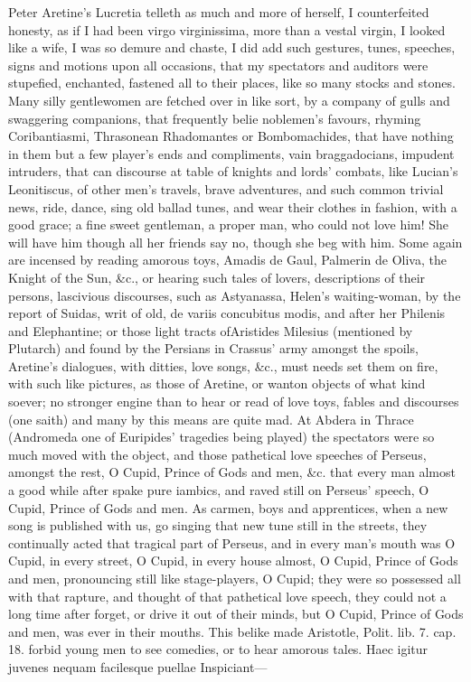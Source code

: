 {Peter Aretine's Lucretia telleth as much and more of herself, I
counterfeited honesty, as if I had been virgo virginissima, more than a
vestal virgin, I looked like a wife, I was so demure and chaste, I did
add such gestures, tunes, speeches, signs and motions upon all
occasions, that my spectators and auditors were stupefied, enchanted,
fastened all to their places, like so many stocks and stones. Many
silly gentlewomen are fetched over in like sort, by a company of gulls
and swaggering companions, that frequently belie noblemen's favours,
rhyming Coribantiasmi, Thrasonean Rhadomantes or Bombomachides, that
have nothing in them but a few player's ends and compliments, vain
braggadocians, impudent intruders, that can discourse at table of
knights and lords' combats, like Lucian's Leonitiscus, of other
men's travels, brave adventures, and such common trivial news, ride,
dance, sing old ballad tunes, and wear their clothes in fashion, with a
good grace; a fine sweet gentleman, a proper man, who could not love
him! She will have him though all her friends say no, though she beg
with him. Some again are incensed by reading amorous toys, Amadis de
Gaul, Palmerin de Oliva, the Knight of the Sun, \&c., or hearing such
tales of lovers, descriptions of their persons, lascivious
discourses, such as Astyanassa, Helen's waiting-woman, by the report of
Suidas, writ of old, de variis concubitus modis, and after her Philenis
and Elephantine; or those light tracts ofAristides Milesius
(mentioned by Plutarch) and found by the Persians in Crassus' army
amongst the spoils, Aretine's dialogues, with ditties, love songs, \&c.,
must needs set them on fire, with such like pictures, as those of
Aretine, or wanton objects of what kind soever; no stronger engine than
to hear or read of love toys, fables and discourses (one saith)
and many by this means are quite mad. At Abdera in Thrace (Andromeda
one of Euripides' tragedies being played) the spectators were so much
moved with the object, and those pathetical love speeches of Perseus,
amongst the rest, O Cupid, Prince of Gods and men, \&c. that every man
almost a good while after spake pure iambics, and raved still on
Perseus' speech, O Cupid, Prince of Gods and men. As carmen, boys and
apprentices, when a new song is published with us, go singing that new
tune still in the streets, they continually acted that tragical part of
Perseus, and in every man's mouth was O Cupid, in every street, O
Cupid, in every house almost, O Cupid, Prince of Gods and men,
pronouncing still like stage-players, O Cupid; they were so possessed
all with that rapture, and thought of that pathetical love speech, they
could not a long time after forget, or drive it out of their minds, but
O Cupid, Prince of Gods and men, was ever in their mouths. This belike
made Aristotle, Polit. lib. 7. cap. 18. forbid young men to see
comedies, or to hear amorous tales.
Haec igitur juvenes nequam facilesque puellae
Inspiciant---

}
